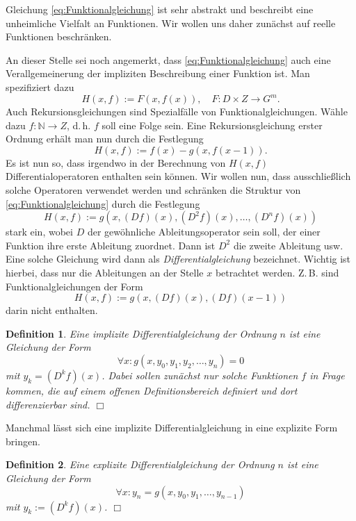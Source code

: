 \documentclass[a4paper,11pt,fleqn,twocolumn,twoside,openany]{scrartcl}
\numberwithin{equation}{section}
\newcommand{\N}{\mathbb N}
\theoremstyle{defstyle}
\newtheorem{Definition}{Definition}
\numberwithin{Definition}{section}
\begin{document}
Gleichung \eqref{eq:Funktionalgleichung} ist sehr abstrakt und
beschreibt eine unheimliche Vielfalt an Funktionen.
Wir wollen uns daher zunächst auf reelle Funktionen beschränken.

An dieser Stelle sei noch angemerkt, dass
\eqref{eq:Funktionalgleichung} auch eine Verallgemeinerung der
impliziten Beschreibung einer Funktion ist. Man spezifiziert dazu%
\begin{equation}
H(x,f) := F(x,f(x)),\quad F\colon D\times Z\to G^m.
\end{equation}
Auch Rekursionsgleichungen sind Spezialfälle von
Funktionalgleichungen. Wähle dazu $f\colon\N\to Z$, d.\,h. $f$ soll
eine Folge sein. Eine Rekursionsgleichung erster Ordnung erhält man
nun durch die Festlegung%
\begin{equation}
H(x,f) := f(x)-g(x,f(x-1)).
\end{equation}
Es ist nun so, dass irgendwo in der Berechnung von $H(x,f)$
Differentialoperatoren enthalten sein können. Wir wollen nun,
dass ausschließlich solche Operatoren verwendet werden
und schränken die Struktur von \eqref{eq:Funktionalgleichung}
durch die Festlegung%
\begin{equation}
H(x,f) := g(x,(Df)(x),(D^2 f)(x),\ldots,(D^n f)(x))
\end{equation}
stark ein, wobei $D$ der gewöhnliche Ableitungsoperator sein soll,
der einer Funktion ihre erste Ableitung zuordnet. Dann ist $D^2$ die
zweite Ableitung usw. Eine solche Gleichung wird dann als
\emph{Differentialgleichung} bezeichnet. Wichtig ist hierbei,
dass nur die Ableitungen an der Stelle $x$ betrachtet werden.
Z.\,B. sind Funktionalgleichungen der Form%
\begin{equation}
H(x,f) := g(x,(Df)(x),(Df)(x-1))
\end{equation}
darin nicht enthalten.
\begin{Definition}
Eine \emph{implizite Differentialgleichung} der Ordnung $n$
ist eine Gleichung der Form%
\begin{equation}
\forall x\colon g(x,y_0,y_1,y_2,\ldots,y_n)=0
\end{equation}
mit $y_k=(D^k f)(x)$. Dabei sollen zunächst nur solche Funktionen $f$
in Frage kommen, die auf einem offenen Definitionsbereich
definiert und dort differenzierbar sind. $\Box$
\end{Definition}
\noindent
Manchmal lässt sich eine implizite Differentialgleichung
in eine explizite Form bringen.
\begin{Definition}
Eine \emph{explizite Differentialgleichung} der Ordnung $n$
ist eine Gleichung der Form%
\begin{equation}
\forall x\colon y_n = g(x,y_0,y_1,\ldots,y_{n-1})
\end{equation}
mit $y_k:=(D^k f)(x)$. $\Box$
\end{Definition}
\end{document}
